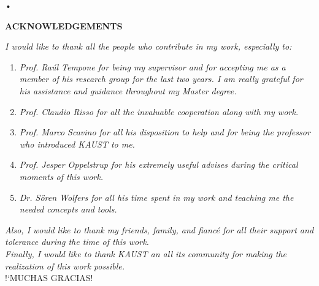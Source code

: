 
\begin{center}
•
\end{center}
\begin{center}

{\bf\fontsize{14pt}{14.5pt}\selectfont \uppercase{Acknowledgements}}\\\vspace{1cm}
\end{center}


\textit{I would like to thank all the people who contribute in my work, especially to:}
\begin{enumerate}

\item \textit{Prof. Ra\'ul Tempone for being my supervisor and for accepting me as a member of his research group for the last two years. I am really grateful for his assistance and guidance throughout my Master degree.}

\item \textit{Prof. Claudio Risso for all the invaluable cooperation along with my work. }

\item \textit{Prof. Marco Scavino for all his disposition to help and for being the professor who introduced KAUST to me.}

\item \textit{Prof. Jesper Oppelstrup for his extremely useful advises during the critical moments of this work.}

\item \textit{Dr. S\"{o}ren Wolfers for all his time spent in my work and teaching me the needed concepts and tools.}

\end{enumerate}
\textit{Also, I would like to thank my friends, family, and fianc\'e for all their support and tolerance during the time of this work.\\
Finally, I would like to thank KAUST an all its community for making the realization of this work possible.}\\
!`MUCHAS GRACIAS! %


